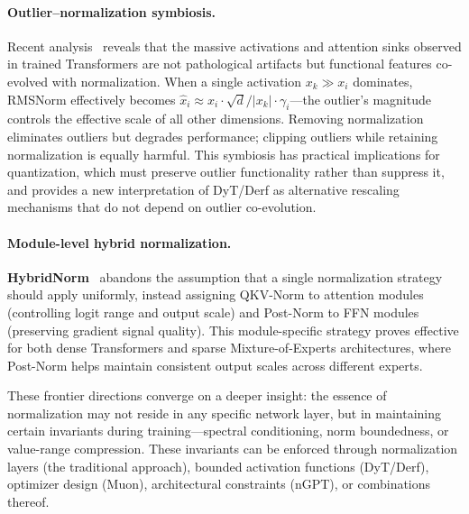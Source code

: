\paragraph{Outlier--normalization symbiosis.}
Recent analysis~\cite{bondarenko2026outlier} reveals that the massive activations and attention sinks observed in trained Transformers are not pathological artifacts but functional features co-evolved with normalization.
When a single activation $x_k \gg x_i$ dominates, RMSNorm effectively becomes $\hat{x}_i \approx x_i \cdot \sqrt{d} / |x_k| \cdot \gamma_i$---the outlier's magnitude controls the effective scale of all other dimensions.
Removing normalization eliminates outliers but degrades performance; clipping outliers while retaining normalization is equally harmful.
This symbiosis has practical implications for quantization, which must preserve outlier functionality rather than suppress it, and provides a new interpretation of DyT/Derf as alternative rescaling mechanisms that do not depend on outlier co-evolution.

\paragraph{Module-level hybrid normalization.}
\textbf{HybridNorm}~\cite{chen2025hybridnorm} abandons the assumption that a single normalization strategy should apply uniformly, instead assigning QKV-Norm to attention modules (controlling logit range and output scale) and Post-Norm to FFN modules (preserving gradient signal quality).
This module-specific strategy proves effective for both dense Transformers and sparse Mixture-of-Experts architectures, where Post-Norm helps maintain consistent output scales across different experts.

\vspace{0.5em}
These frontier directions converge on a deeper insight: the essence of normalization may not reside in any specific network layer, but in maintaining certain invariants during training---spectral conditioning, norm boundedness, or value-range compression.
These invariants can be enforced through normalization layers (the traditional approach), bounded activation functions (DyT/Derf), optimizer design (Muon), architectural constraints (nGPT), or combinations thereof.

